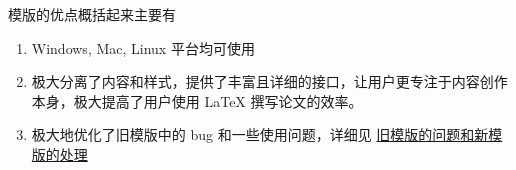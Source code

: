  模版的优点概括起来主要有
\begin{enumerate}
  \item Windows, Mac, Linux 平台均可使用
  \item 极大分离了内容和样式，提供了丰富且详细的接口，让用户更专注于内容创作本身，极大提高了用户使用 \LaTeX{} 撰写论文的效率。
  \item 极大地优化了旧模版中的 bug 和一些使用问题，详细见 \href{https://gitee.com/xkwxdyy/CCNUthesis/wikis/%E6%97%A7%E6%A8%A1%E7%89%88%E7%9A%84%E9%97%AE%E9%A2%98%E5%92%8C%E6%96%B0%E6%A8%A1%E7%89%88%E7%9A%84%E5%A4%84%E7%90%86}{旧模版的问题和新模版的处理}
\end{enumerate}